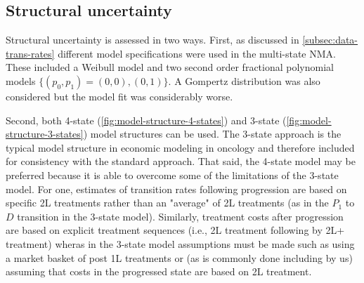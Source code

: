 \documentclass[11pt,final,fleqn]{article}\usepackage[]{graphicx}\usepackage[]{color}
\theoremstyle{plain}
\begin{document}
\subsection{Structural uncertainty}
Structural uncertainty is assessed in two ways. First, as discussed in \autoref{subsec:data-trans-rates} different model specifications were used in the multi-state NMA. These included a Weibull model and two second order fractional polynomial models $\{(p_0, p_1) = (0, 0), (0,1)\}$. A Gompertz distribution was also considered but the model fit was considerably worse. 

Second, both  4-state (\autoref{fig:model-structure-4-states}) and 3-state (\autoref{fig:model-structure-3-states}) model structures can be used. The 3-state approach is the typical model structure in economic modeling in oncology and therefore included for consistency with the standard approach. That said, the 4-state model may be preferred because it is able to overcome some of the limitations of the 3-state model. For one, estimates of transition rates following progression are based on specific 2L treatments rather than an "average" of 2L treatments (as in the $P_1$ to $D$ transition in the 3-state model). Similarly, treatment costs after progression are based on explicit treatment sequences (i.e., 2L treatment following by 2L+ treatment) wheras in the 3-state model assumptions must be made such as using a market basket of post 1L treatments or (as is commonly done including by us) assuming that costs in the progressed state are based on 2L treatment.
\end{document}
